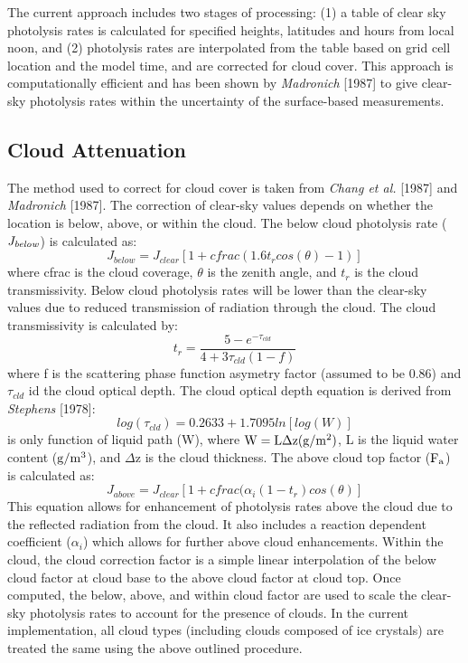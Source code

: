 The current approach includes two stages of processing: (1) a table of clear sky photolysis rates is calculated for specified heights, latitudes and hours 
from local noon, and (2)  photolysis rates are interpolated from the table 
based on grid cell location and the model time, and are corrected for cloud 
cover. This approach is computationally efficient and has been shown by 
{\it Madronich} [1987] to give clear-sky photolysis rates within the 
uncertainty of the surface-based measurements.

\subsection{Cloud Attenuation}
The method used to correct for cloud cover is taken from 
{\it Chang et al.} [1987] and {\it Madronich} [1987]. The correction of 
clear-sky values depends on whether the location is below, above, or 
within the cloud. The below cloud photolysis rate ($\it J_{below}$) is 
calculated as: 
$$
J_{below} = J_{clear} [ 1 + cfrac(1.6 t_r cos(\theta) - 1) ]
$$
where cfrac is the cloud coverage, $\theta$ is the zenith angle, and $t_r$ 
is the cloud transmissivity. Below cloud photolysis rates will be lower than 
the clear-sky values due to reduced transmission of radiation through 
the cloud. The cloud transmissivity is calculated by:
$$
 t_r = \frac{5-e^{-\tau_{cld}}}{4 + 3 \tau_{cld} (1 - f)}
$$
where f is the scattering phase function asymetry factor (assumed to be 0.86) 
and $\tau_{cld}$ id the cloud optical depth. The cloud 
optical depth equation is derived  from {\it Stephens} [1978]: 
$$
log(\tau_{cld}) = 0.2633 + 1.7095ln[log(W)]
$$
is only function of liquid path (W), where $\rm W=L\Delta z (g/m^2)$, L is the 
liquid water content ($\rm g/m^3$), and $\Delta$z is the cloud thickness. 
The above cloud top factor ($\rm F_a$) is calculated as:
$$
J_{above} = J_{clear} [1 + cfrac(\alpha_i (1-t_r)cos(\theta)]
$$
This equation allows for enhancement of photolysis rates above the cloud 
due to the reflected radiation from the cloud. It also includes a reaction 
dependent coefficient ($\alpha_i$) which allows for further above cloud 
enhancements. Within the cloud, the cloud correction factor is a simple 
linear interpolation of the below cloud factor at cloud base to the above 
cloud factor at cloud top. Once computed, the below, above, and within cloud 
factor are used to scale the clear-sky photolysis rates to account for the 
presence of clouds. In the current implementation, all cloud types (including 
clouds composed of ice crystals) are treated the same using the above outlined
procedure.  

